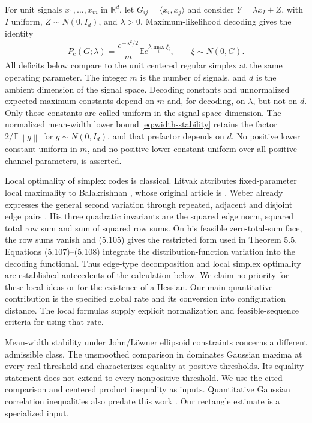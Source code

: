 \documentclass[11pt]{article}
\theoremstyle{remark}\newtheorem{remark}[theorem]{Remark}
\newcommand{\R}{\mathbb R}
\newcommand{\E}{\mathbb E}
\newcommand{\norm}[1]{\left\lVert#1\right\rVert}
\newcommand{\Pc}{P_{\mathrm c}}
\begin{document}
For unit signals $x_1,\ldots,x_m$ in $\R^d$, let $G_{ij}=\langle x_i,x_j\rangle$
and consider $Y=\lambda x_I+Z$, with $I$ uniform, $Z\sim N(0,I_d)$, and $\lambda>0$.
Maximum-likelihood decoding gives the identity
\begin{equation}\label{eq:pc}
 \Pc(G;\lambda)=\frac{e^{-\lambda^2/2}}m
       \E e^{\lambda\max_i\xi_i},\qquad \xi\sim N(0,G).
\end{equation}
All deficits below compare to the unit centered regular simplex at the same
operating parameter. The integer $m$ is the number of signals, and $d$ is the
ambient dimension of the signal space. Decoding constants and unnormalized
expected-maximum constants depend on $m$ and, for decoding, on $\lambda$, but
not on $d$. Only those constants are called uniform in the signal-space
dimension. The normalized mean-width lower bound \eqref{eq:width-stability}
retains the factor $2/\E\norm g$ for $g\sim N(0,I_d)$, and that prefactor
depends on $d$. No positive lower constant uniform in $m$, and no positive
lower constant uniform over all positive channel parameters, is asserted.

Local optimality of simplex codes is classical.
Litvak attributes fixed-parameter local maximality to Balakrishnan
\cite[Theorem 2.5]{Litvak}, whose original article is \cite{Balakrishnan}.
Weber already expresses the general second variation through repeated,
adjacent and disjoint edge pairs \cite[Lemma 5.8, equation (5.102)]{Weber}.
His three quadratic invariants are the squared edge norm, squared total row
sum and sum of squared row sums. On his feasible zero-total-sum face,
the row sums vanish and (5.105) gives the restricted form used in Theorem 5.5.
Equations (5.107)--(5.108) integrate the distribution-function variation into
the decoding functional. Thus edge-type decomposition and local simplex
optimality are established antecedents of the calculation below.
We claim no priority for these local ideas or for the existence of a Hessian.
Our main quantitative contribution is the specified global rate and its
conversion into configuration distance. The local formulas supply explicit
normalization and feasible-sequence criteria for using that rate.

Mean-width stability under John/L\"owner ellipsoid constraints \cite{BFH}
concerns a different admissible class. The unsmoothed comparison in
\cite[Theorem 1.1]{MulgundFull} dominates Gaussian maxima at every real
threshold and characterizes equality at positive thresholds.
Its equality statement does not extend to every nonpositive threshold.
We use the cited comparison and centered product inequality as inputs.
Quantitative Gaussian correlation inequalities also predate this work
\cite{DNS}. Our rectangle estimate is a specialized input.
\end{document}
